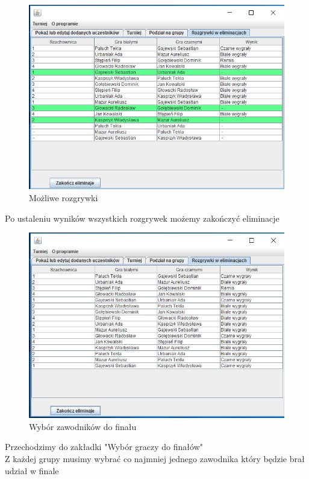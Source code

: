 \begin{figure}[H]
	\centering
	\includegraphics[width=15cm]{fig/13}
	\caption{Możliwe rozgrywki}
	\label {fig:mozliwe_rozgrywki_2} 
\end{figure}
Po ustaleniu wyników wszystkich rozgrywek możemy zakończyć eliminacje
\begin{figure}[H]
	\centering
	\includegraphics[width=15cm]{fig/14}
	\caption{Wybór zawodników do finału}
	\label {fig:wybor_zawodnikow_do_finalu} 
\end{figure}
Przechodzimy do zakładki "Wybór graczy do finałów"\\
Z każdej grupy musimy wybrać co najmniej jednego zawodnika który będzie brał udział w finale
